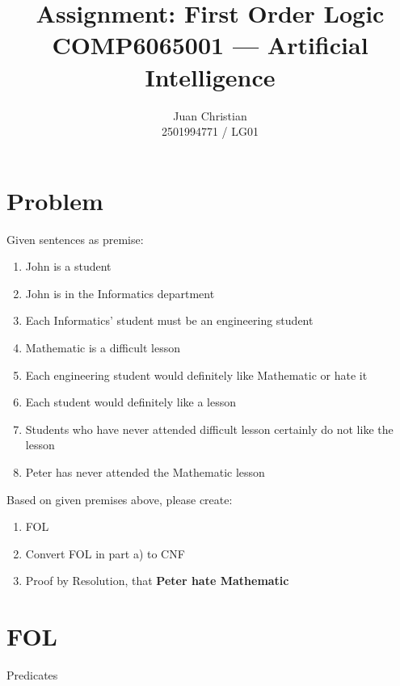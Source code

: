 \documentclass[a4paper, 12pt]{article}
\title{
    Assignment: First Order Logic\\
    COMP6065001 --- Artificial Intelligence
}
\author{
    \bd{Nama:} Juan Christian \\
    \bd{NIM/Kelas:} 2501994771 / LG01
}
\date{}
\newcommand{\bd}{\textbf}
\begin{document}
\maketitle
\section*{Problem}
Given sentences as premise:
\begin{enumerate}
    \item John is a student
    \item John is in the Informatics department
    \item Each Informatics' student must be an engineering student
    \item Mathematic is a difficult lesson
    \item Each engineering student would definitely like Mathematic or hate it
    \item Each student would definitely like a lesson
    \item Students who have never attended difficult lesson certainly do not like the lesson
    \item Peter has never attended the Mathematic lesson
\end{enumerate}
Based on given premises above, please create:

\begin{enumerate}[label=(\alph*)]
    \item FOL
    \item Convert FOL in part a) to CNF
    \item Proof by Resolution, that \bd{Peter hate Mathematic}
\end{enumerate}
\newpage

\section*{FOL}

Predicates
\end{document}
